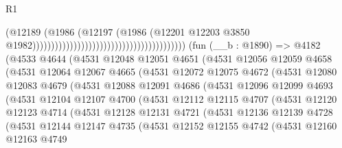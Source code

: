\begin{lexlean}{R1}
\begin{coremodule}
                                                                            (@12189
                                                                              (@1986
                                                                                (@12197
                                                                                  (@1986
                                                                                    (@12201
                                                                                      @12203
                                                                                      @3850
                                                                                      @1982)))))))))))))))))))))))))))))))))))))))))
    (fun (__b : @1890) =>
    @4182
      (@4533
        @4644
        (@4531
          @12048
          @12051
          @4651
          (@4531
            @12056
            @12059
            @4658
            (@4531
              @12064
              @12067
              @4665
              (@4531
                @12072
                @12075
                @4672
                (@4531
                  @12080
                  @12083
                  @4679
                  (@4531
                    @12088
                    @12091
                    @4686
                    (@4531
                      @12096
                      @12099
                      @4693
                      (@4531
                        @12104
                        @12107
                        @4700
                        (@4531
                          @12112
                          @12115
                          @4707
                          (@4531
                            @12120
                            @12123
                            @4714
                            (@4531
                              @12128
                              @12131
                              @4721
                              (@4531
                                @12136
                                @12139
                                @4728
                                (@4531
                                  @12144
                                  @12147
                                  @4735
                                  (@4531
                                    @12152
                                    @12155
                                    @4742
                                    (@4531
                                      @12160
                                      @12163
                                      @4749

\end{coremodule}
\end{lexlean}
